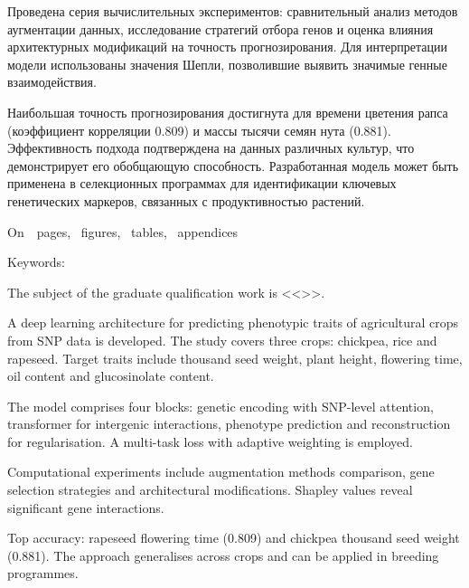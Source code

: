 Проведена серия вычислительных экспериментов: сравнительный анализ методов 
аугментации данных, исследование стратегий отбора генов и оценка влияния 
архитектурных модификаций на точность прогнозирования. Для интерпретации 
модели использованы значения Шепли, позволившие выявить значимые генные 
взаимодействия.

Наибольшая точность прогнозирования достигнута для времени цветения рапса 
(коэффициент корреляции 0.809) и массы тысячи семян нута (0.881). 
Эффективность подхода подтверждена на данных различных культур, что 
демонстрирует его обобщающую способность. Разработанная модель может 
быть применена в селекционных программах для идентификации ключевых 
генетических маркеров, связанных с продуктивностью растений.



\printTheAbstract %


On~~pages, 
~figures, 
~tables,
~appendices%

{Keywords: \keywordsEn} %
	
The subject of the graduate qualification work is <<\thesisTitleEn>>.
	
	
A deep learning architecture for predicting phenotypic traits of agricultural crops from SNP data is developed. The study covers three crops: chickpea, rice and rapeseed. Target traits include thousand seed weight, plant height, flowering time, oil content and glucosinolate content.

The model comprises four blocks: genetic encoding with SNP-level attention, 
transformer for intergenic interactions, phenotype prediction and reconstruction 
for regularisation. A multi-task loss with adaptive weighting is employed.

Computational experiments include augmentation methods comparison, gene 
selection strategies and architectural modifications. Shapley values reveal 
significant gene interactions.

Top accuracy: rapeseed flowering time (0.809) and chickpea thousand seed 
weight (0.881). The approach generalises across crops and can be applied 
in breeding programmes.

	


\thispagestyle{empty}
%
